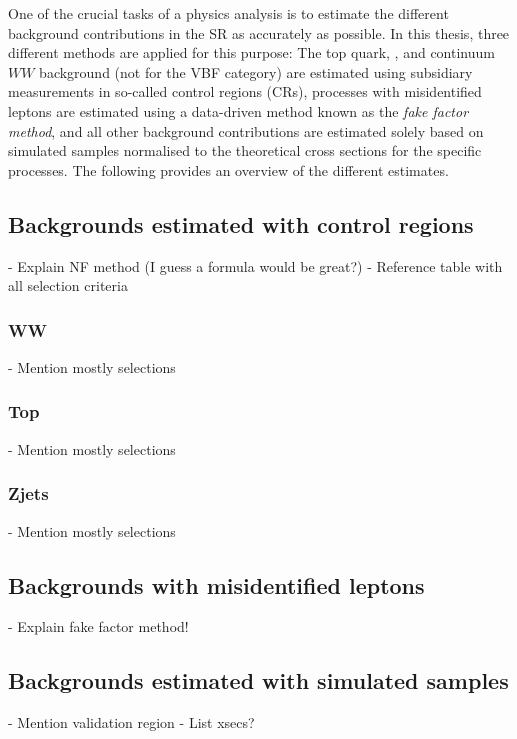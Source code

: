 
One of the crucial tasks of a physics analysis is to estimate the different background contributions in the SR as accurately as possible.
In this thesis, three different methods are applied for this purpose: 
The top quark, \Zjets, and continuum $WW$ background (not for the VBF category) are estimated using subsidiary measurements in so-called control regions (CRs), processes with misidentified leptons are estimated using a data-driven method known as the \emph{fake factor method}, and all other background contributions are estimated solely based on simulated samples normalised to the theoretical cross sections for the specific processes.
The following provides an overview of the different estimates.

\subsection{Backgrounds estimated with control regions}

- Explain NF method (I guess a formula would be great?)
- Reference table with all selection criteria

\subsubsection{WW}

- Mention mostly selections

\subsubsection{Top}
- Mention mostly selections
\subsubsection{Zjets}
- Mention mostly selections

\subsection{Backgrounds with misidentified leptons}
- Explain fake factor method!

\subsection{Backgrounds estimated with simulated samples}
- Mention validation region
- List xsecs?
